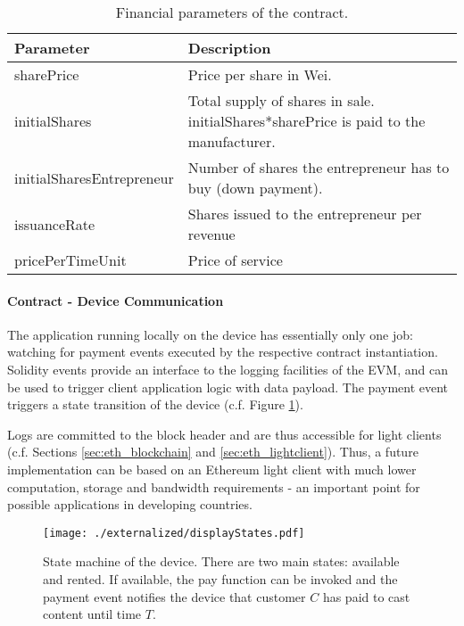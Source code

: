 \begin{table}
  \centering
  \begin{tabularx}{\textwidth}{ l  X  }
    \toprule
    Parameter & Description \\
    \midrule
    sharePrice & Price per share in Wei. \\ 
    initialShares & Total supply of shares in sale. initialShares*sharePrice is paid to the manufacturer.\\
    initialSharesEntrepreneur & Number of shares the entrepreneur has to buy (down payment). \\
    issuanceRate & Shares issued to the entrepreneur per revenue \\  
    pricePerTimeUnit & Price of service \\  
    \bottomrule
  \end{tabularx}
  \caption{Financial parameters of the contract.}
  \label{tbl:parameters}
\end{table}


\paragraph{Contract - Device Communication}

The application running locally on the device has essentially only one job: watching for payment events executed by the respective contract instantiation. Solidity events provide an interface to the logging facilities of the \ac{EVM}, and can be used to trigger client application logic with data payload. The payment event triggers a state transition of the device (c.f. Figure \ref{fig:displayStates}).

Logs are committed to the block header and are thus accessible for light clients (c.f. Sections \ref{sec:eth_blockchain} and \ref{sec:eth_lightclient}). Thus, a future implementation can be based on an Ethereum light client with much lower computation, storage and bandwidth requirements - an important point for possible applications in developing countries.

\begin{figure}
 \centering
 \texttt{[image: ./externalized/displayStates.pdf]}
 \caption{State machine of the device. There are two main states: available and rented. If available, the pay function can be invoked and the payment event notifies the device that customer $C$ has paid to cast content until time $T$.}
 \label{fig:displayStates}
 \end{figure}


